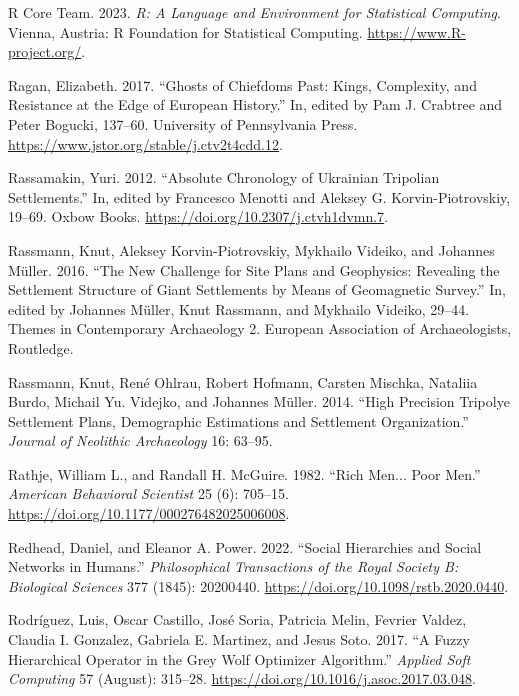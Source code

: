 \documentclass[
  12pt,
  a4paper, twoside]{book}
\newlength{\cslhangindent}
\newlength{\cslentryspacingunit} %
\newenvironment{CSLReferences}[2] %
 {%
  \setlength{\parindent}{0pt}
  \ifodd #1
  \let\oldpar\par
  \def\par{\hangindent=\cslhangindent\oldpar}
  \fi
  \setlength{\parskip}{#2\cslentryspacingunit}
 }%
 {}
\begin{document}
\begin{CSLReferences}{1}{0}
\leavevmode{}%
R Core Team. 2023. \emph{R: A Language and Environment for Statistical Computing}. Vienna, Austria: R Foundation for Statistical Computing. \url{https://www.R-project.org/}.

\leavevmode{}%
Ragan, Elizabeth. 2017. {``Ghosts of Chiefdoms Past: Kings, Complexity, and Resistance at the Edge of European History.''} In, edited by Pam J. Crabtree and Peter Bogucki, 137--60. University of Pennsylvania Press. \url{https://www.jstor.org/stable/j.ctv2t4cdd.12}.

\leavevmode{}%
Rassamakin, Yuri. 2012. {``Absolute Chronology of Ukrainian Tripolian Settlements.''} In, edited by Francesco Menotti and Aleksey G. Korvin-Piotrovskiy, 19--69. Oxbow Books. \url{https://doi.org/10.2307/j.ctvh1dvmn.7}.

\leavevmode{}%
Rassmann, Knut, Aleksey Korvin-Piotrovskiy, Mykhailo Videiko, and Johannes Müller. 2016. {``The New Challenge for Site Plans and Geophysics: Revealing the Settlement Structure of Giant Settlements by Means of Geomagnetic Survey.''} In, edited by Johannes Müller, Knut Rassmann, and Mykhailo Videiko, 29--44. Themes in Contemporary Archaeology 2. European Association of Archaeologists, Routledge.

\leavevmode{}%
Rassmann, Knut, René Ohlrau, Robert Hofmann, Carsten Mischka, Nataliia Burdo, Michail Yu. Videjko, and Johannes Müller. 2014. {``High Precision Tripolye Settlement Plans, Demographic Estimations and Settlement Organization.''} \emph{Journal of Neolithic Archaeology} 16: 63--95.

\leavevmode{}%
Rathje, William L., and Randall H. McGuire. 1982. {``Rich Men... Poor Men.''} \emph{American Behavioral Scientist} 25 (6): 705--15. \url{https://doi.org/10.1177/000276482025006008}.

\leavevmode{}%
Redhead, Daniel, and Eleanor A. Power. 2022. {``Social Hierarchies and Social Networks in Humans.''} \emph{Philosophical Transactions of the Royal Society B: Biological Sciences} 377 (1845): 20200440. \url{https://doi.org/10.1098/rstb.2020.0440}.

\leavevmode{}%
Rodríguez, Luis, Oscar Castillo, José Soria, Patricia Melin, Fevrier Valdez, Claudia I. Gonzalez, Gabriela E. Martinez, and Jesus Soto. 2017. {``A Fuzzy Hierarchical Operator in the Grey Wolf Optimizer Algorithm.''} \emph{Applied Soft Computing} 57 (August): 315--28. \url{https://doi.org/10.1016/j.asoc.2017.03.048}.


\end{CSLReferences}
\end{document}
